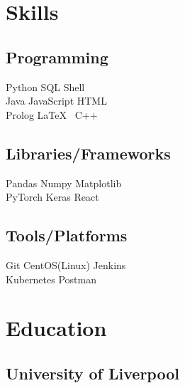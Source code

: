 \documentclass[]{CV}
\begin{document}
\hfill
\begin{minipage}[t]{0.25\textwidth} 


\section{Skills}
\subsection{Programming}
\sectionsep
{}
Python \textbullet{} SQL \textbullet{} Shell \\
\sectionsep
{}
Java \textbullet{} JavaScript \textbullet{}  HTML  \\
\sectionsep
{}
Prolog \textbullet{}  \LaTeX\ \textbullet{} C++  \\
\sectionsep
\sectionsep
\subsection{Libraries/Frameworks}
\sectionsep
Pandas \textbullet{} Numpy \textbullet{} Matplotlib \\ PyTorch \textbullet{} Keras \textbullet{} React \\
\sectionsep
\sectionsep
\subsection{Tools/Platforms}
\sectionsep
Git \textbullet{} CentOS(Linux) \textbullet{} Jenkins  \\ Kubernetes \textbullet{} Postman \\

\sectionsep


\section{Education} 
\subsection{University of Liverpool}


\end{minipage}
\end{document}
